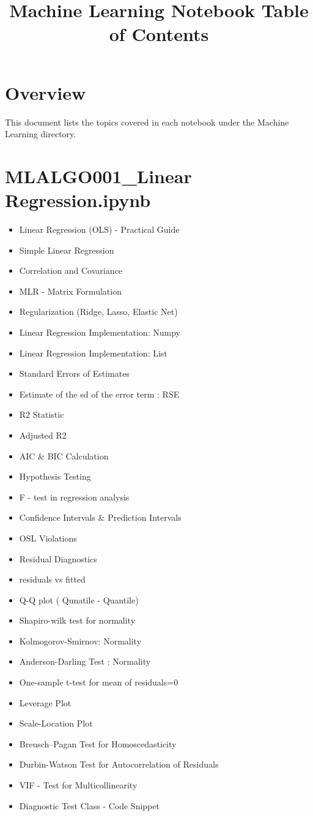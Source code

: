 \documentclass[11pt]{article}
\begin{document}
\title{Machine Learning Notebook Table of Contents}
\author{}
\date{}
\maketitle
\section*{Overview}
This document lists the topics covered in each notebook under the Machine Learning directory.
\section*{MLALGO001\_Linear Regression.ipynb}
\begin{itemize}
\item Linear Regression (OLS) - Practical Guide
\item Simple Linear Regression
\item Correlation and Covariance
\item MLR - Matrix Formulation
\item Regularization (Ridge, Lasso, Elastic Net)
\item Linear Regression Implementation: Numpy
\item Linear Regression Implementation: List
\item Standard Errors of Estimates
\item Estimate of the sd of the error term : RSE
\item R2 Statistic
\item Adjusted R2
\item AIC \& BIC Calculation
\item Hypothesis Testing
\item F - test in regression analysis
\item Confidence Intervals \& Prediction Intervals
\item OSL Violations
\item Residual Diagnostics
\item residuals vs fitted
\item Q-Q plot ( Qunatile - Quantile)
\item Shapiro-wilk test for normality
\item Kolmogorov-Smirnov: Normality
\item Anderson-Darling Test : Normality
\item One-sample t-test for mean of residuals=0
\item Leverage Plot
\item Scale-Location Plot
\item Breusch–Pagan Test for Homoscedasticity
\item Durbin-Watson Test for Autocorrelation of Residuals
\item VIF - Test for Multicollinearity
\item Diagnostic Test Class - Code Snippet
\end{itemize}
\end{document}
